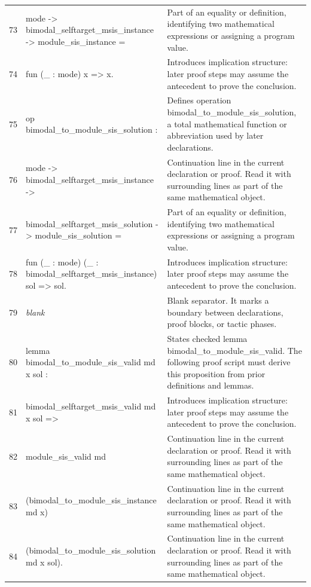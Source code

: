 \documentclass[10pt]{article}
\begin{document}
\begin{longtable}{r L{0.53\textwidth} L{0.37\textwidth}}
73 & {\ttfamily\scriptsize   mode -> bimodal\_selftarget\_msis\_instance -> module\_sis\_instance =} & Part of an equality or definition, identifying two mathematical expressions or assigning a program value. \\
74 & {\ttfamily\scriptsize   fun (\_ : mode) x => x.} & Introduces implication structure: later proof steps may assume the antecedent to prove the conclusion. \\
75 & {\ttfamily\scriptsize op bimodal\_to\_module\_sis\_solution :} & Defines operation bimodal\_to\_module\_sis\_solution, a total mathematical function or abbreviation used by later declarations. \\
76 & {\ttfamily\scriptsize   mode -> bimodal\_selftarget\_msis\_instance ->} & Continuation line in the current declaration or proof.  Read it with surrounding lines as part of the same mathematical object. \\
77 & {\ttfamily\scriptsize   bimodal\_selftarget\_msis\_solution -> module\_sis\_solution =} & Part of an equality or definition, identifying two mathematical expressions or assigning a program value. \\
78 & {\ttfamily\scriptsize   fun (\_ : mode) (\_ : bimodal\_selftarget\_msis\_instance) sol => sol.} & Introduces implication structure: later proof steps may assume the antecedent to prove the conclusion. \\
79 & {\ttfamily\scriptsize \emph{blank}} & Blank separator.  It marks a boundary between declarations, proof blocks, or tactic phases. \\
80 & {\ttfamily\scriptsize lemma bimodal\_to\_module\_sis\_valid md x sol :} & States checked lemma bimodal\_to\_module\_sis\_valid.  The following proof script must derive this proposition from prior definitions and lemmas. \\
81 & {\ttfamily\scriptsize   bimodal\_selftarget\_msis\_valid md x sol =>} & Introduces implication structure: later proof steps may assume the antecedent to prove the conclusion. \\
82 & {\ttfamily\scriptsize   module\_sis\_valid md} & Continuation line in the current declaration or proof.  Read it with surrounding lines as part of the same mathematical object. \\
83 & {\ttfamily\scriptsize     (bimodal\_to\_module\_sis\_instance md x)} & Continuation line in the current declaration or proof.  Read it with surrounding lines as part of the same mathematical object. \\
84 & {\ttfamily\scriptsize     (bimodal\_to\_module\_sis\_solution md x sol).} & Continuation line in the current declaration or proof.  Read it with surrounding lines as part of the same mathematical object. \\

\end{longtable}
\end{document}
